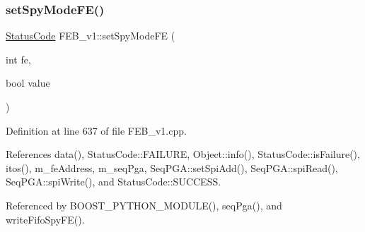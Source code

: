 \subsubsection{\texorpdfstring{set\+Spy\+Mode\+F\+E()}{setSpyModeFE()}}
{\footnotesize\ttfamily \hyperlink{classStatusCode}{Status\+Code} F\+E\+B\+\_\+v1\+::set\+Spy\+Mode\+FE (\begin{DoxyParamCaption}\item[{int}]{fe,  }\item[{bool}]{value }\end{DoxyParamCaption})}



Definition at line 637 of file F\+E\+B\+\_\+v1.\+cpp.



References data(), Status\+Code\+::\+F\+A\+I\+L\+U\+RE, Object\+::info(), Status\+Code\+::is\+Failure(), itos(), m\+\_\+fe\+Address, m\+\_\+seq\+Pga, Seq\+P\+G\+A\+::set\+Spi\+Add(), Seq\+P\+G\+A\+::spi\+Read(), Seq\+P\+G\+A\+::spi\+Write(), and Status\+Code\+::\+S\+U\+C\+C\+E\+SS.



Referenced by B\+O\+O\+S\+T\+\_\+\+P\+Y\+T\+H\+O\+N\+\_\+\+M\+O\+D\+U\+L\+E(), seq\+Pga(), and write\+Fifo\+Spy\+F\+E().


